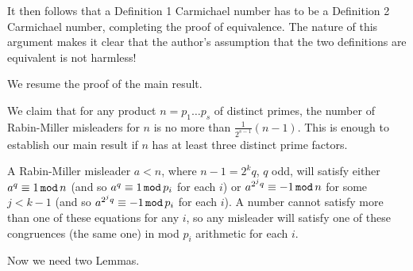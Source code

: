 \documentclass[12pt]{article}
\begin{document}
It then follows that a Definition 1 Carmichael number has to be a Definition 2 Carmichael number, completing the proof of equivalence.   The nature of this argument makes it clear that the author's assumption that the two definitions are equivalent is not harmless!

We resume the proof of the main result.

We claim that for any product $n=p_1\ldots p_s$ of distinct primes, the number of Rabin-Miller misleaders
for $n$ is no more than $\frac1{2^{s-1}}(n-1)$.   This is enough to establish our main result if $n$ has at least three distinct prime factors.

A Rabin-Miller misleader $a<n$, where $n-1=2^kq$, $q$ odd, will satisfy either $a^q \equiv 1\,{\tt mod}\,n$
(and so $a^q \equiv 1\,{\tt mod}\,p_i$ for each $i$) or  $a^{2^jq} \equiv -1\,{\tt mod}\,n$ for some $j<k-1$
(and so $a^{2^jq} \equiv -1\,{\tt mod}\,p_i$ for each $i$).   A number cannot satisfy more than one of these
equations for any $i$, so any misleader will satisfy one of these congruences (the same one) in mod $p_i$ arithmetic for each $i$.

Now we need two Lemmas.
\end{document}
